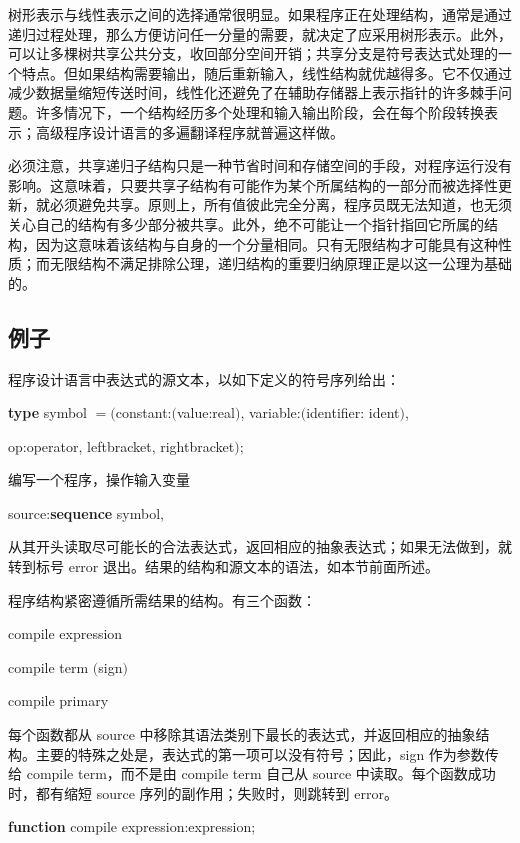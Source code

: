 \documentclass[twoside,11pt,fontset=none]{ctexbook}
\begin{document}
树形表示与线性表示之间的选择通常很明显。如果程序正在处理结构，通常是通过递归过程处理，那么方便访问任一分量的需要，就决定了应采用树形表示。此外，可以让多棵树共享公共分支，收回部分空间开销；共享分支是符号表达式处理的一个特点。但如果结构需要输出，随后重新输入，线性结构就优越得多。它不仅通过减少数据量缩短传送时间，线性化还避免了在辅助存储器上表示指针的许多棘手问题。许多情况下，一个结构经历多个处理和输入输出阶段，会在每个阶段转换表示；高级程序设计语言的多遍翻译程序就普遍这样做。

必须注意，共享递归子结构只是一种节省时间和存储空间的手段，对程序运行没有影响。这意味着，只要共享子结构有可能作为某个所属结构的一部分而被选择性更新，就必须避免共享。原则上，所有值彼此完全分离，程序员既无法知道，也无须关心自己的结构有多少部分被共享。此外，绝不可能让一个指针指回它所属的结构，因为这意味着该结构与自身的一个分量相同。只有无限结构才可能具有这种性质；而无限结构不满足排除公理，递归结构的重要归纳原理正是以这一公理为基础的。

\subsection{例子}
\label{sec:example-9-2}

程序设计语言中表达式的源文本，以如下定义的符号序列给出：

\quad \textbf{type} symbol $= ($constant:$($value:real$)$, variable:$($identifier: ident$)$,

\tabto*{9.2em}op:operator, leftbracket, rightbracket$)$;

编写一个程序，操作输入变量

\quad source:\textbf{sequence} symbol,

\noindent
从其开头读取尽可能长的合法表达式，返回相应的抽象表达式；如果无法做到，就转到标号 error 退出。结果的结构和源文本的语法，如本节前面所述。

程序结构紧密遵循所需结果的结构。有三个函数：

\quad compile expression

\quad compile term $($sign$)$

\quad compile primary

\noindent
每个函数都从 source 中移除其语法类别下最长的表达式，并返回相应的抽象结构。主要的特殊之处是，表达式的第一项可以没有符号；因此，sign 作为参数传给 compile term，而不是由 compile term 自己从 source 中读取。每个函数成功时，都有缩短 source 序列的副作用；失败时，则跳转到 error。

\noindent
\textbf{function} compile expression:expression;
\end{document}
